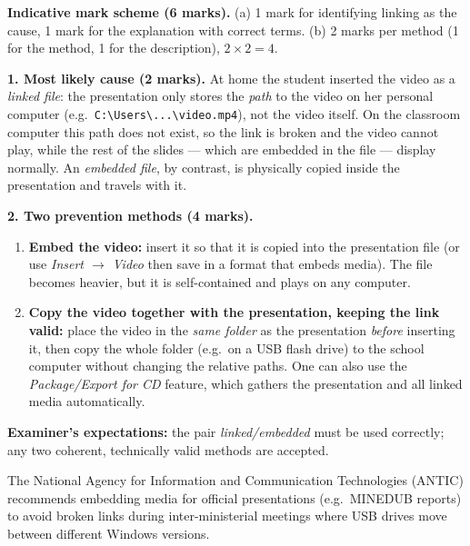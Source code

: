 \documentclass[11pt]{article}
\begin{document}
\begin{corrige}
\textbf{Indicative mark scheme (6 marks).} (a) 1 mark for identifying linking as the cause, 1 mark for the explanation with correct terms. (b) 2 marks per method (1 for the method, 1 for the description), $2 \times 2 = 4$.

\textbf{1. Most likely cause (2 marks).} At home the student inserted the video as a \emph{linked file}: the presentation only stores the \emph{path} to the video on her personal computer (e.g.\ \texttt{C:\textbackslash Users\textbackslash...\textbackslash video.mp4}), not the video itself. On the classroom computer this path does not exist, so the link is broken and the video cannot play, while the rest of the slides — which are embedded in the file — display normally. An \emph{embedded file}, by contrast, is physically copied inside the presentation and travels with it.

\textbf{2. Two prevention methods (4 marks).}
\begin{enumerate}
\item \textbf{Embed the video:} insert it so that it is copied into the presentation file (or use \emph{Insert $\rightarrow$ Video} then save in a format that embeds media). The file becomes heavier, but it is self-contained and plays on any computer.
\item \textbf{Copy the video together with the presentation, keeping the link valid:} place the video in the \emph{same folder} as the presentation \emph{before} inserting it, then copy the whole folder (e.g.\ on a USB flash drive) to the school computer without changing the relative paths. One can also use the \emph{Package/Export for CD} feature, which gathers the presentation and all linked media automatically.
\end{enumerate}
\textbf{Examiner's expectations:} the pair \emph{linked/embedded} must be used correctly; any two coherent, technically valid methods are accepted.
\begin{savaistu}
The National Agency for Information and Communication Technologies (ANTIC) recommends embedding media for official presentations (e.g.\ MINEDUB reports) to avoid broken links during inter-ministerial meetings where USB drives move between different Windows versions.
\end{savaistu}
\end{corrige}
\end{document}
